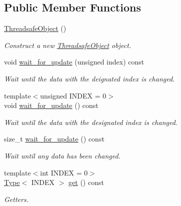 \subsection*{Public Member Functions}
\begin{DoxyCompactItemize}
\item 
\mbox{\label{classreal__time__tools_1_1ThreadsafeObject_a4b1b5185f60ed5228e307c10639dfe63}} 
\hyperlink{classreal__time__tools_1_1ThreadsafeObject_a4b1b5185f60ed5228e307c10639dfe63}{Threadsafe\+Object} ()
\begin{DoxyCompactList}\small\item\em Construct a new \hyperlink{classreal__time__tools_1_1ThreadsafeObject}{Threadsafe\+Object} object. \end{DoxyCompactList}\item 
void \hyperlink{classreal__time__tools_1_1ThreadsafeObject_a85d7f9175a08a3440f9bb783fd4aa264}{wait\+\_\+for\+\_\+update} (unsigned index) const
\begin{DoxyCompactList}\small\item\em Wait until the data with the deignated index is changed. \end{DoxyCompactList}\item 
{\footnotesize template$<$unsigned I\+N\+D\+EX = 0$>$ }\\void \hyperlink{classreal__time__tools_1_1ThreadsafeObject_a2b1cc6a7d2691e8266130701975fd1f1}{wait\+\_\+for\+\_\+update} () const
\begin{DoxyCompactList}\small\item\em Wait until the data with the designated index is changed. \end{DoxyCompactList}\item 
size\+\_\+t \hyperlink{classreal__time__tools_1_1ThreadsafeObject_a16807abf31871861f2fc3e228ecda18f}{wait\+\_\+for\+\_\+update} () const
\begin{DoxyCompactList}\small\item\em Wait until any data has been changed. \end{DoxyCompactList}\item 
{\footnotesize template$<$int I\+N\+D\+EX = 0$>$ }\\\hyperlink{classreal__time__tools_1_1ThreadsafeObject_afcbd77df1964d4fe606f1e776f1ff9b8}{Type}$<$ I\+N\+D\+EX $>$ \hyperlink{classreal__time__tools_1_1ThreadsafeObject_a866719911ad3b4b78c9abd1140862b7f}{get} () const
\begin{DoxyCompactList}\small\item\em Getters. \end{DoxyCompactList}\item 

\end{DoxyCompactItemize}
